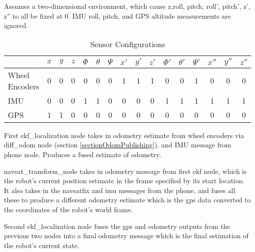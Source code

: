 Assumes a two-dimensional environment, which cause z,roll, pitch, roll', pitch', z', z'' to all be fixed at 0. IMU roll, pitch, and GPS altitude measurements are ignored.

\begin{table}
	\caption {Sensor Configurations \cite{robot_localization_paper}}
	\label{tab:configs}
	\begin{center}
		\begin{tabular}{|l|a|b|a|b|a|b|a|b|a|b|a|b|a|b|a|} \hline
			\theadfont{}&
			\textbf{\(x\)} & \textbf{\(y\)} & \textbf{\(z\)} & \textbf{\(\Phi\)} & \textbf{\(\theta\)} & \textbf{\(\Psi\)} & \textbf{\(x'\)} & \textbf{\(y'\)} & \textbf{\(z'\)} & \textbf{\(\Phi '\)} & \textbf{\(\theta '\)} & \textbf{\(\Psi '\)} & \textbf{\(x''\)} & \textbf{\(y''\)} & \textbf{\(z''\)} \\ \hline
			Wheel Encoders & 0 & 0 & 0 & 0 & 0 & 0 & 1 & 1 & 1 & 0 & 0 & 1 & 0 & 0 & 0 \\    \hline
			IMU & 0 & 0 & 0 & 1 & 1 & 0 & 0 & 0 & 0 & 1 & 1 & 1 & 1 & 1 & 1 \\ \hline
			GPS & 1 & 1 & 0 & 0 & 0 & 0 & 0 & 0 & 0 & 0 & 0 & 0 & 0 & 0 & 0 \\ \hline
		\end{tabular}
	\end{center}
\end{table}

First ekf\_localization node takes in odometry estimate from wheel encoders via diff\_odom node (section \ref{sectionOdomPublishing}), and IMU message from phone node. Produces a fused estimate of odometry.

navsat\_transform\_node takes in odometry message from first ekf node, which is the robot’s current position estimate in the frame specified by its start location. It also takes in the navsatfix and imu messages from the phone, and fuses all these to produce a different odometry estimate which is the gps data converted to the coordinates of the robot's world frame.

Second ekf\_localization node fuses the gps and odometry outputs from the previous two nodes into a final odometry message which is the final estimation of the robot's current state.


\cite{robot_localization_paper}
